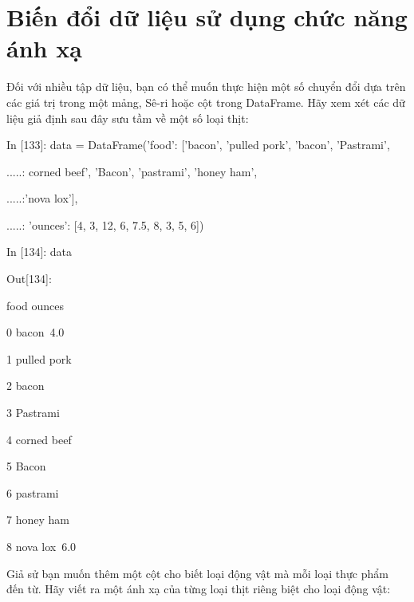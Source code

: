     
\section{Biến đổi dữ liệu sử dụng chức năng ánh xạ}
Đối với nhiều tập dữ liệu, bạn có thể muốn thực hiện một số chuyển đổi dựa trên các giá trị trong một mảng, Sê-ri hoặc cột trong DataFrame. Hãy xem xét các dữ liệu giả định sau đây sưu tầm về một số loại thịt:\par\par
    \quad\textup{In [133]: data = DataFrame({'food': ['bacon', 'pulled pork', 'bacon', 'Pastrami', }}\par
    \quad\textup{    .....: \quad\quad\quad\quad\quad\quad\quad\quad\quad\quad corned beef', 'Bacon', 'pastrami', 'honey ham',  }\par
    \quad\textup{   .....:\quad\quad\quad\quad\quad\quad\quad\quad\quad\quad                            'nova lox'],  }\par
    \quad\textup{      .....: \quad\quad\quad\quad\quad\quad\quad\quad\quad\quad                  'ounces': [4, 3, 12, 6, 7.5, 8, 3, 5, 6]) }\par
    \quad\textup{In [134]: data }\par
    \quad\textup{Out[134]: }\par
    \quad\quad\quad\textup{food  \quad\quad ounces }\par
    \quad\textup{0 \quad bacon\quad\quad\quad\     4.0 }\par
    \quad\textup{1  \quad pulled pork  }\par
    \quad\textup{2  \quad  bacon \quad \quad{}  }\par
    \quad\textup{3  \quad  Pastrami\quad{}  }\par
    \quad\textup{4   \quad corned beef }\par
    \quad\textup{5  \quad  Bacon \quad\quad{}  }\par
    \quad\textup{6  \quad  pastrami  \quad{}  }\par
    \quad\textup{7  \quad  honey ham       }\par
    \quad\textup{8  \quad  nova lox\quad\quad\ 6.0  }\par
Giả sử bạn muốn thêm một cột cho biết loại động vật mà mỗi loại thực phẩm đến từ. Hãy viết ra một ánh xạ của từng loại thịt riêng biệt cho loại động vật: \par\par
